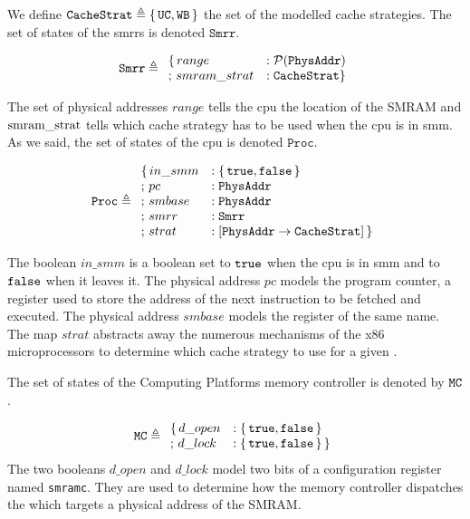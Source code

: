 We define $\texttt{CacheStrat} \triangleq \{\,\mathtt{UC}, \mathtt{WB}\,\}$ the
set of the modelled cache strategies.
%
The set of states of the \ac{smrr}s is denoted $\texttt{Smrr}$.

\[ \texttt{Smrr} \triangleq
  \begin{array}{ll}
    \{\,range &: \mathcal{P}(\texttt{PhysAddr}) \\
    ;\,smram\_strat &: \texttt{CacheStrat} \}
  \end{array}
\]

The set of physical addresses $range$ tells the \ac{cpu} the location of the
SMRAM and $\mathrm{smram\_strat}$ tells which cache strategy has to be used when
the \ac{cpu} is in \ac{smm}.
%
As we said, the set of states of the \ac{cpu} is denoted $\texttt{Proc}$.

\[
  \texttt{Proc} \triangleq
  \begin{array}{ll}
    \{\,in\_smm &: \{\,\mathtt{true}, \mathtt{false}\,\} \\
    ;\,pc &: \texttt{PhysAddr} \\
    ;\,smbase &: \texttt{PhysAddr} \\
    ;\,smrr &: \texttt{Smrr} \\
    ;\,strat &: [ \texttt{PhysAddr} \rightarrow \texttt{CacheStrat}]\,\}
  \end{array}
\]

The boolean $in\_smm$ is a boolean set to $\mathtt{true}$ when the \ac{cpu} is in
\ac{smm} and to $\mathtt{false}$ when it leaves it.
%
The physical address $pc$ models the program counter, a register used to store
the address of the next instruction to be fetched and executed.
%
The physical address $smbase$ models the register of the same name.
%
The map $strat$ abstracts away the numerous mechanisms of the x86
microprocessors to determine which cache strategy to use for a given \IO.

The set of states of the  Computing Platforms memory
controller is denoted by $\mathtt{MC}$.

\[
  \texttt{MC} \triangleq
  \begin{array}{ll}
    \{\,d\_open &: \{\,\mathtt{true}, \mathtt{false}\,\} \\
    ;\,d\_lock &: \{\,\mathtt{true}, \mathtt{false}\,\}\,\}
  \end{array}
\]
%
The two booleans $d\_open$ and $d\_lock$ model two bits of a configuration
register named \texttt{smramc}.
%
They are used to determine how the memory controller dispatches the \IO which
targets a physical address of the SMRAM.

